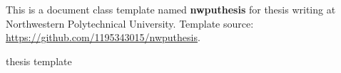 
\begin{abstract}
    这是一个适用于西北工业大学学位论文写作的文档类模板 \textbf{nwputhesis}，模板来源：\url{https://github.com/1195343015/nwputhesis}。
    \begin{keywords}
        学位论文 \sep 模板
    \end{keywords}
\end{abstract}

\begin{engabstract}
    This is a document class template named \textbf{nwputhesis} for thesis writing at Northwestern Polytechnical University. Template source: \url{https://github.com/1195343015/nwputhesis}.
    \begin{engkeywords}
        thesis \ensep template
    \end{engkeywords}
\end{engabstract}
